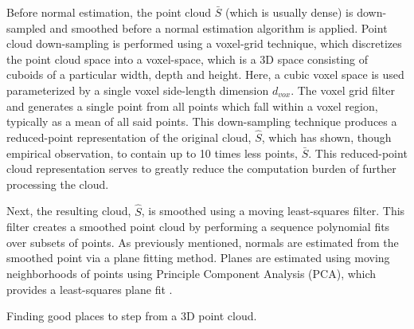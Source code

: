 			Before normal estimation, the point cloud $\bar{S}$ (which is usually dense) is down-sampled and smoothed before a normal estimation algorithm is applied. Point cloud down-sampling is performed using a voxel-grid technique, which discretizes the point cloud space into a voxel-space, which is a 3D space consisting of cuboids of a particular width, depth and height. Here, a cubic voxel space is used parameterized by a single voxel side-length dimension $d_{vox}$. The voxel grid filter and generates a single point from all points which fall within a voxel region, typically as a mean of all said points. This down-sampling technique produces a reduced-point representation of the original cloud, $\hat{S}$, which has shown, though empirical observation, to contain up to 10 times less points, $\bar{S}$. This reduced-point cloud representation serves to greatly reduce the computation burden of further processing the cloud.

			Next, the resulting cloud, $\hat{S}$, is smoothed using a moving least-squares filter. This filter creates a smoothed point cloud by performing a sequence polynomial fits over subsets of points. As previously mentioned, normals are estimated from the smoothed point via a plane fitting method. Planes are estimated using moving neighborhoods of points using Principle Component Analysis (PCA), which provides a least-squares plane fit \cite{Castillo2013}.
			\begin{algorithm}[!h]
				\begin{algorithmic}
						\EndIf
					\EndFor
				\end{algorithmic}	
				\caption{Finding good places to step from a 3D point cloud.}
				\label{alg::goodspacestostep}
			\end{algorithm}

